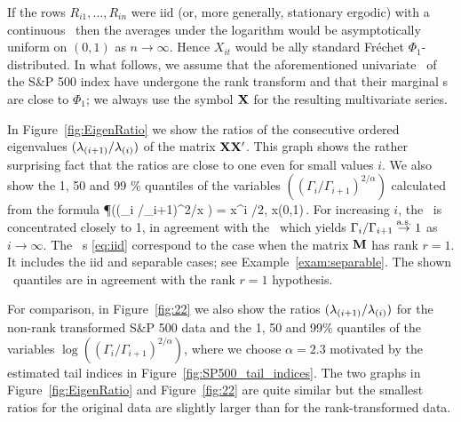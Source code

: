 
If the rows $R_{i1}, \ldots, R_{in}$ were iid (or, more generally, stationary ergodic)
with a continuous \ds\  then
the averages under the logarithm would be  asymptotically uniform
on $(0,1)$ as $n \to \infty$. Hence $X_{it}$ would  be \asy ally standard
Fr\'echet $\Phi_1$-distributed.
In what follows, we assume that the aforementioned univariate \ts\ of the S\&P 500 index have undergone the rank transform and that
their marginal \ds s are close to $\Phi_1$; we
always use the symbol ${\mathbf X}$ for the resulting multivariate series.
\par
In Figure~\ref{fig:EigenRatio} we show the ratios of the consecutive ordered eigenvalues $(\lambda_{(i+1)}/\lambda_{(i)})$
of the matrix ${\mathbf X}{\mathbf X}'$. This graph shows the rather surprising fact that the ratios are close to one even for small values $i$.
We also show the 1, 50 and 99 \% quantiles of the variables $((\Gamma_{i}/\Gamma_{i+1})^{2/\alpha})$ calculated from the formula
\beam\label{eq:iid}
\P\big((\Gamma_{i} /\Gamma_{i+1})^{2/\alpha}\le x \big) = x^{i \cdot \alpha/2}, \quad x\in (0,1)\,.
\eeam
For increasing $i$, the \ds\ is concentrated closely to 1, in agreement with the \slln\ which yields
$\Gamma_{i} /\Gamma_{i+1}\stackrel{\rm a.s.}{\rightarrow} 1$ as $i\to\infty$.
The \asy\ \ds s \eqref{eq:iid} correspond to the case when the matrix
${\mathbf M}$ has rank $r=1$. It includes the iid and separable cases;
see Example~\ref{exam:separable}. The shown \asy\ quantiles are in agreement with the rank $r=1$ hypothesis.
\par
For comparison, in Figure~\ref{fig:22} we also show the ratios  $(\lambda_{(i+1)}/\lambda_{(i)})$ for the 
non-rank transformed S\&P 500 data and the 1, 50 and 99\% quantiles of the variables
$\log((\Gamma_i/ \Gamma_{i+1})^{2/\alpha})$, where we choose $\alpha=2.3$ motivated by the estimated tail indices in 
Figure~\ref{fig:SP500_tail_indices}.
The two graphs in Figure~\ref{fig:EigenRatio} and Figure~\ref{fig:22} are quite similar but the smallest ratios for the original data are slightly larger than
for the rank-transformed data.




